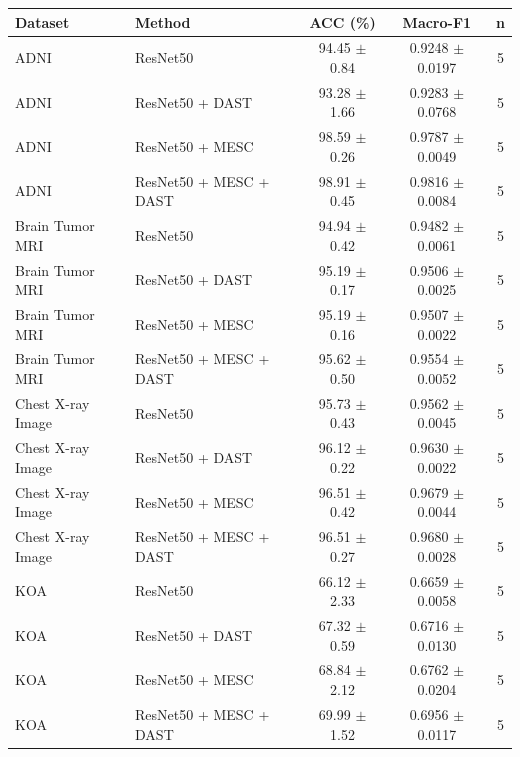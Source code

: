 \begin{tabular}{llccc}
\toprule
Dataset & Method & ACC (\%) & Macro-F1 & n \\
\midrule
ADNI & ResNet50 & 94.45 $\pm$ 0.84 & 0.9248 $\pm$ 0.0197 & 5 \\
ADNI & ResNet50 + DAST & 93.28 $\pm$ 1.66 & 0.9283 $\pm$ 0.0768 & 5 \\
ADNI & ResNet50 + MESC & 98.59 $\pm$ 0.26 & 0.9787 $\pm$ 0.0049 & 5 \\
ADNI & ResNet50 + MESC + DAST & 98.91 $\pm$ 0.45 & 0.9816 $\pm$ 0.0084 & 5 \\
Brain Tumor MRI & ResNet50 & 94.94 $\pm$ 0.42 & 0.9482 $\pm$ 0.0061 & 5 \\
Brain Tumor MRI & ResNet50 + DAST & 95.19 $\pm$ 0.17 & 0.9506 $\pm$ 0.0025 & 5 \\
Brain Tumor MRI & ResNet50 + MESC & 95.19 $\pm$ 0.16 & 0.9507 $\pm$ 0.0022 & 5 \\
Brain Tumor MRI & ResNet50 + MESC + DAST & 95.62 $\pm$ 0.50 & 0.9554 $\pm$ 0.0052 & 5 \\
Chest X-ray Image & ResNet50 & 95.73 $\pm$ 0.43 & 0.9562 $\pm$ 0.0045 & 5 \\
Chest X-ray Image & ResNet50 + DAST & 96.12 $\pm$ 0.22 & 0.9630 $\pm$ 0.0022 & 5 \\
Chest X-ray Image & ResNet50 + MESC & 96.51 $\pm$ 0.42 & 0.9679 $\pm$ 0.0044 & 5 \\
Chest X-ray Image & ResNet50 + MESC + DAST & 96.51 $\pm$ 0.27 & 0.9680 $\pm$ 0.0028 & 5 \\
KOA & ResNet50 & 66.12 $\pm$ 2.33 & 0.6659 $\pm$ 0.0058 & 5 \\
KOA & ResNet50 + DAST & 67.32 $\pm$ 0.59 & 0.6716 $\pm$ 0.0130 & 5 \\
KOA & ResNet50 + MESC & 68.84 $\pm$ 2.12 & 0.6762 $\pm$ 0.0204 & 5 \\
KOA & ResNet50 + MESC + DAST & 69.99 $\pm$ 1.52 & 0.6956 $\pm$ 0.0117 & 5 \\
\bottomrule
\end{tabular}
